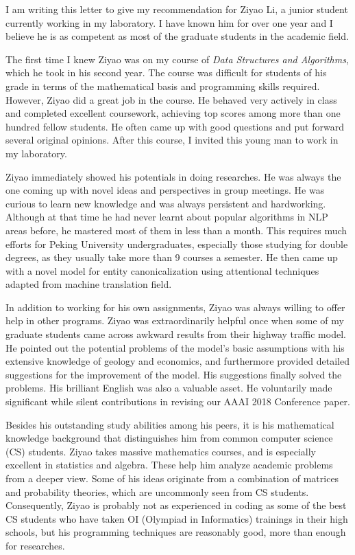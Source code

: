 \documentclass[12pt]{article}
\begin{document}
I am writing this letter to give my recommendation for Ziyao Li, a junior student currently working in my laboratory. I have known him for over one year and I believe he is as competent as most of the graduate students in the academic field.

The first time I knew Ziyao was on my course of \textit{Data Structures and Algorithms}, which he took in his second year. The course was difficult for students of his grade in terms of the mathematical basis and programming skills required. However, Ziyao did a great job in the course. He behaved very actively in class and completed excellent coursework, achieving top scores among more than one hundred fellow students. He often came up with good questions and put forward several original opinions. After this course, I invited this young man to work in my laboratory.

Ziyao immediately showed his potentials in doing researches. He was always the one coming up with novel ideas and perspectives in group meetings. He was curious to learn new knowledge and was always persistent and hardworking. Although at that time he had never learnt about popular algorithms in NLP areas before, he mastered most of them in less than a month. This requires much efforts for Peking University undergraduates, especially those studying for double degrees, as they usually take more than 9 courses a semester. He then came up with a novel model for entity canonicalization using attentional techniques adapted from machine translation field.

In addition to working for his own assignments, Ziyao was always willing to offer help in other programs. Ziyao was extraordinarily helpful once when some of my graduate students came across awkward results from their highway traffic model. He pointed out the potential problems of the model’s basic assumptions with his extensive knowledge of geology and economics, and furthermore provided detailed suggestions for the improvement of the model. His suggestions finally solved the problems. His brilliant English was also a valuable asset. He voluntarily made significant while silent contributions in revising our AAAI 2018 Conference paper.

Besides his outstanding study abilities among his peers, it is his mathematical knowledge background that distinguishes him from common computer science (CS) students. Ziyao takes massive mathematics courses, and is especially excellent in statistics and algebra. These help him analyze academic problems from a deeper view. Some of his ideas originate from a combination of matrices and probability theories, which are uncommonly seen from CS students. Consequently, Ziyao is probably not as experienced in coding as some of the best CS students who have taken OI (Olympiad in Informatics) trainings in their high schools, but his programming techniques are reasonably good, more than enough for researches.
\end{document}
